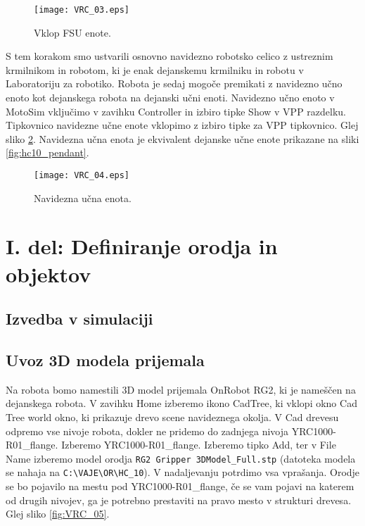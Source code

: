 \begin{figure}[hbt]
	\centering
	\texttt{[image: VRC\_03.eps]}
	\caption{Vklop FSU enote.}
	\label{fig:VRC_03}
\end{figure}

S tem korakom smo ustvarili osnovno navidezno robotsko celico z ustreznim krmilnikom in robotom, ki je enak dejanskemu krmilniku in robotu v Laboratoriju za robotiko. Robota je sedaj mogoče premikati z navidezno učno enoto kot dejanskega robota na dejanski učni enoti. Navidezno učno enoto v MotoSim vključimo v zavihku Controller in izbiro tipke Show v VPP razdelku. Tipkovnico navidezne učne enote vklopimo z izbiro tipke za VPP tipkovnico. Glej sliko \ref{fig:VRC_04}. Navidezna učna enota je ekvivalent dejanske učne enote prikazane na sliki \ref{fig:hc10_pendant}.

\begin{figure}[hbt]
	\centering
	\texttt{[image: VRC\_04.eps]}
	\caption{Navidezna učna enota.}
	\label{fig:VRC_04}
\end{figure}

\clearpage

\section{I. del: Definiranje orodja in objektov}

\subsection{Izvedba v simulaciji} \label{sim1}

\subsection*{Uvoz 3D modela prijemala}

Na robota bomo namestili 3D model prijemala OnRobot RG2, ki je nameščen na dejanskega robota. V zavihku Home izberemo ikono CadTree, ki vklopi okno Cad Tree world okno, ki prikazuje drevo scene navideznega okolja. V Cad drevesu odpremo vse nivoje robota, dokler ne pridemo do zadnjega nivoja YRC1000-R01\_flange. Izberemo  YRC1000-R01\_flange. Izberemo tipko Add, ter v File Name izberemo model orodja \verb|RG2 Gripper 3DModel_Full.stp| (datoteka modela se nahaja na \verb|C:\VAJE\OR\HC_10|). V nadaljevanju potrdimo vsa vprašanja. Orodje se bo pojavilo na mestu pod YRC1000-R01\_flange, če se vam pojavi na katerem od drugih nivojev, ga je potrebno prestaviti na pravo mesto v strukturi drevesa. Glej sliko \ref{fig:VRC_05}.

